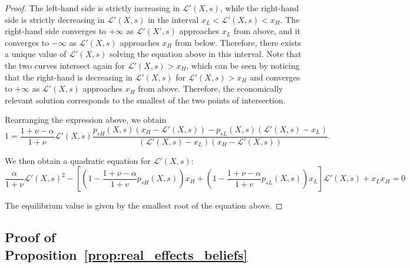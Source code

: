 \begin{proof}
The left-hand side is strictly increasing in $\mathcal{L}'(X,s)$, while the right-hand side is strictly decreasing in $\mathcal{L}'(X,s)$ in the interval $x_L < \mathcal{L}'(X,s) < x_H$. 
The right-hand side converges to $+\infty$ as $\mathcal{L}'(X',s)$ approaches $x_L$ from above, and it converges to $-\infty$ as $\mathcal{L}'(X,s)$ approaches $x_H$ from below. 
Therefore, there exists a unique value of $\mathcal{L}'(X,s)$ solving the equation above in this interval. 
Note that the two curves intersect again for $\mathcal{L}'(X,s) > x_H$, which can be seen by noticing that the right-hand is decreasing in $\mathcal{L}'(X,s)$ for $\mathcal{L}'(X,s) > x_H$ and converges to $+\infty$ as $\mathcal{L}'(X,s)$ approaches $x_H$ from above.
Therefore, the economically relevant solution corresponds to the smallest of the two points of intersection.


Rearranging the expression above, we obtain
\begin{equation}
    1 = \frac{1+\nu-\alpha}{1+\nu} \mathcal{L}'(X,s) \frac{p_{sH}(X,s) (x_H-\mathcal{L}'(X,s))- p_{sL}(X,s)(\mathcal{L}'(X,s) - x_L) }{(\mathcal{L}'(X,s) - x_L) (x_H-\mathcal{L}'(X,s))}.
\end{equation}

We then obtain a quadratic equation for $\mathcal{L}'(X,s)$:\small
\begin{equation}
    \frac{\alpha}{1+\nu} \mathcal{L}'(X,s)^2  - \left[ \left( 1 - \frac{1+\nu-\alpha}{1+v} p_{sH}(X,s) \right) x_H + \left( 1 - \frac{1+\nu-\alpha}{1+v} p_{sL}(X,s) \right) x_L  \right] \mathcal{L}'(X,s) + x_L x_H = 0
\end{equation}\normalsize

The equilibrium value is given by the smallest root of the equation above. 

\end{proof}

\subsection{Proof of Proposition~\ref{prop:real_effects_beliefs}}

